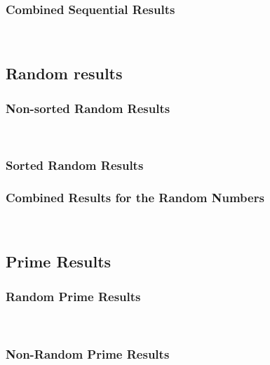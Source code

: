 \subsubsection{Combined Sequential Results}
\label{combined_sequential}
\\


\subsection{Random results}
\label{random_results}
\subsubsection{Non-sorted Random Results}
\label{non-sorted_random_results}
\\


\subsubsection{Sorted Random Results}

\subsubsection{Combined Results for the Random Numbers}
\\


\subsection{Prime Results}
\label{prime_results}

\subsubsection{Random Prime Results}
\label{random_prime_results}

\\


\subsubsection{Non-Random Prime Results}
\label{non-random_prime_results}
\\



